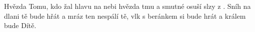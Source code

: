 \begin{TEXT}{Hvězda}
\SLOKA {}Tomu, kdo  žal hlavu  \NL
{} na nebi hvězda  \NL
{} tmu a smutné  \NL
{} osuší slzy z .
\SLOKA Sníh na dlani tě bude hřát\NL
a mráz ten nespálí tě,\NL
vlk s beránkem si bude hrát\NL
a králem bude Dítě.\NL
\end{TEXT}
